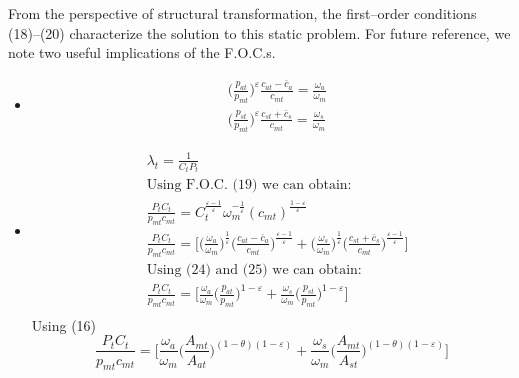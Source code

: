 \documentclass{article}
\begin{document}
    From the perspective of structural transformation, the first–order conditions (18)–(20) characterize the solution to this static problem. For future reference, we note two useful implications of the F.O.C.s.
    \begin{itemize}
        \item \begin{align}
                    &\biggl( \frac{p_{at}}{p_{mt}} \biggr)^\varepsilon \frac{c_{at}-\bar{c}_a}{c_{mt}}=\frac{\omega_a}{\omega_m}\\
                    &\biggl( \frac{p_{st}}{p_{mt}} \biggr)^\varepsilon \frac{c_{st}+\bar{c}_s}{c_{mt}}=\frac{\omega_s}{\omega_m}
              \end{align}

        \item 
            \begin{align*}
                &\lambda_t=\frac{1}{C_tP_t}\\
                &\text{Using F.O.C. (19) we can obtain:}\\
                &\frac{P_tC_t}{p_{mt}c_{mt}}=C_{t}^{\frac{\varepsilon-1}{\varepsilon}} \omega_m^{-\frac{1}{\varepsilon}} (c_{mt})^{\frac{1-\varepsilon}{\varepsilon}}\\
                &\frac{P_tC_t}{p_{mt}c_{mt}}=\biggl[ \biggl(\frac{\omega_a}{\omega_m}\biggr)^{\frac{1}{\varepsilon}} \biggl( \frac{c_{at}-\bar{c}_a}{c_{mt}} \biggr)^\frac{\varepsilon-1}{\varepsilon} + \biggl(\frac{\omega_s}{\omega_m}\biggr)^{\frac{1}{\varepsilon}} \biggl( \frac{c_{st}+\bar{c}_s}{c_{mt}} \biggr)^\frac{\varepsilon-1}{\varepsilon}  \biggr]\\
                &\text{Using (24) and (25) we can obtain:}\\
                &\frac{P_tC_t}{p_{mt}c_{mt}}=\biggl[ \frac{\omega_a}{\omega_m} \biggl( \frac{p_{at}}{p_{mt}} \biggr)^{1-\varepsilon} + \frac{\omega_s}{\omega_m} \biggl( \frac{p_{st}}{p_{mt}} \biggr)^{1-\varepsilon}  \biggr]\\
            \end{align*}
            Using (16)
            \begin{equation}
                \frac{P_tC_t}{p_{mt}c_{mt}}=\biggl[ \frac{\omega_a}{\omega_m} \biggl( \frac{A_{mt}}{A_{at}} \biggr)^{(1-\theta)(1-\varepsilon)} + \frac{\omega_s}{\omega_m} \biggl( \frac{A_{mt}}{A_{st}} \biggr)^{(1-\theta)(1-\varepsilon)}  \biggr]
            \end{equation}
    \end{itemize}
        
\end{document}

